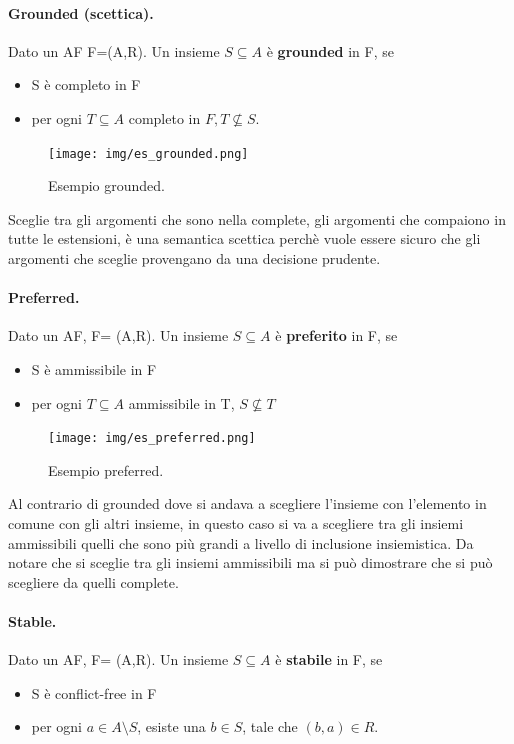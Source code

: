 \paragraph{Grounded (scettica).} Dato un AF F=(A,R). Un insieme $S \subseteq A$ è \textbf{grounded} in F, se 
\begin{itemize}
    \item S è completo in F
    \item per ogni $T \subseteq A$ completo in $F,T \nsubseteq  S$.
\end{itemize}

\begin{figure}[H]
    \centering
    \texttt{[image: img/es\_grounded.png]}
    \caption{Esempio grounded.}\label{fig:es_insieme_grounded}
\end{figure}
Sceglie tra gli argomenti che sono nella complete, gli argomenti che compaiono in tutte le estensioni, è una semantica scettica perchè vuole essere sicuro che gli argomenti che sceglie provengano da una decisione prudente. 

\paragraph{Preferred.} Dato un AF, F= (A,R). Un insieme $S\subseteq A$ è \textbf{preferito} in F, se 
\begin{itemize}
    \item S è ammissibile in F
    \item per ogni $T\subseteq A$ ammissibile in T, $S\nsubseteq T$
\end{itemize}


\begin{figure}[H]
    \centering
    \texttt{[image: img/es\_preferred.png]}
    \caption{Esempio preferred.}\label{fig:es_insieme_preferred}
\end{figure}

Al contrario di grounded dove si andava a scegliere l'insieme con l'elemento in comune con gli altri insieme, in questo caso si va a scegliere tra gli insiemi ammissibili quelli che sono più grandi a livello di inclusione insiemistica. Da notare che si sceglie tra gli insiemi ammissibili ma si può dimostrare che si può scegliere da quelli complete.

\paragraph{Stable.} Dato un AF, F= (A,R). Un insieme $S\subseteq A$ è \textbf{stabile} in F, se
\begin{itemize}
    \item S è conflict-free in F
    \item per ogni $a\in A\setminus S$, esiste una $b\in S$, tale che $(b,a)\in R$. 
\end{itemize}

